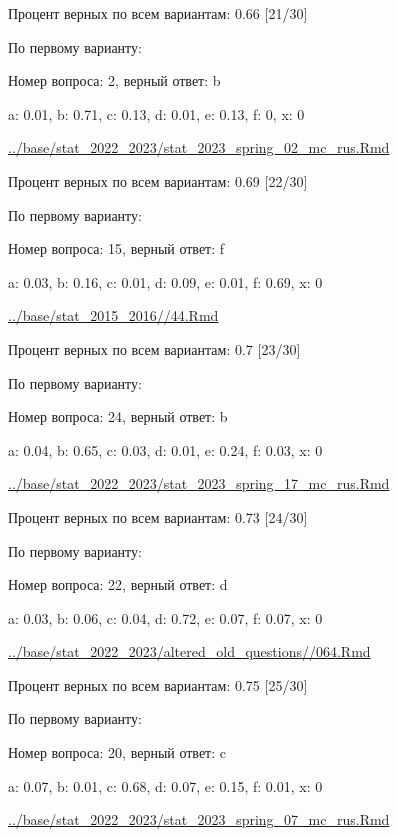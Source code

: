 Процент верных по всем вариантам: 0.66 [21/30]

По первому варианту:

Номер вопроса: 2, верный ответ: b

a: 0.01, b: 0.71, c: 0.13, d: 0.01, e: 0.13, f: 0, x: 0

\url{../base/stat_2022_2023/stat_2023_spring_02_mc_rus.Rmd}





Процент верных по всем вариантам: 0.69 [22/30]

По первому варианту:

Номер вопроса: 15, верный ответ: f

a: 0.03, b: 0.16, c: 0.01, d: 0.09, e: 0.01, f: 0.69, x: 0

\url{../base/stat_2015_2016//44.Rmd}





Процент верных по всем вариантам: 0.7 [23/30]

По первому варианту:

Номер вопроса: 24, верный ответ: b

a: 0.04, b: 0.65, c: 0.03, d: 0.01, e: 0.24, f: 0.03, x: 0

\url{../base/stat_2022_2023/stat_2023_spring_17_mc_rus.Rmd}





Процент верных по всем вариантам: 0.73 [24/30]

По первому варианту:

Номер вопроса: 22, верный ответ: d

a: 0.03, b: 0.06, c: 0.04, d: 0.72, e: 0.07, f: 0.07, x: 0

\url{../base/stat_2022_2023/altered_old_questions//064.Rmd}





Процент верных по всем вариантам: 0.75 [25/30]

По первому варианту:

Номер вопроса: 20, верный ответ: c

a: 0.07, b: 0.01, c: 0.68, d: 0.07, e: 0.15, f: 0.01, x: 0

\url{../base/stat_2022_2023/stat_2023_spring_07_mc_rus.Rmd}






